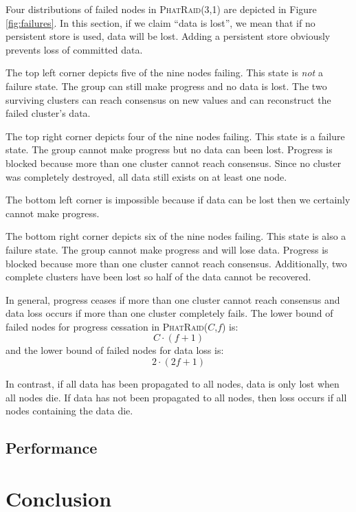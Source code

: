 \documentclass[10pt,letter]{article}
\newcommand{\phatraidcf}[2]{\textsc{PhatRaid}(#1,#2)}
\begin{document}
Four distributions of failed nodes in \phatraidcf{3}{1} are depicted in Figure
\ref{fig:failures}. In this section, if we claim ``data is lost'', we mean that
if no persistent store is used, data will be lost. Adding a persistent store
obviously prevents loss of committed data.

The top left corner depicts five of the nine nodes failing. This state is
\emph{not} a failure state. The group can still make progress and no data is
lost. The two surviving clusters can reach consensus on new values and can
reconstruct the failed cluster's data.

The top right corner depicts four of the nine nodes failing. This state is a
failure state. The group cannot make progress but no data can been
lost. Progress is blocked because more than one cluster cannot reach
consensus. Since no cluster was completely destroyed, all data still exists on
at least one node.

The bottom left corner is impossible because if data can be lost then we
certainly cannot make progress.

The bottom right corner depicts six of the nine nodes failing. This state is
also a failure state. The group cannot make progress and will lose
data. Progress is blocked because more than one cluster cannot reach
consensus. Additionally, two complete clusters have been lost so half of the
data cannot be recovered.

In general, progress ceases if more than one cluster cannot reach consensus and
data loss occurs if more than one cluster completely fails. The lower bound of
failed nodes for progress cessation in \phatraidcf{$C$}{$f$} is:
    $$ C\cdot(f+1) $$
and the lower bound of failed nodes for data loss is:
    $$ 2\cdot(2f+1) $$

In contrast, if all data has been propagated to all nodes, data is only lost
when all nodes die. If data has not been propagated to all nodes, then loss
occurs if all nodes containing the data die. 

\subsection{Performance}

\section{Conclusion}



\end{document}
